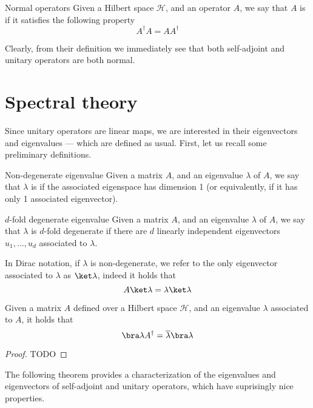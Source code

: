 \documentclass[a4paper, 12pt]{report}
\begin{document}
\begin{frameddefn}{Normal operators}
	Given a Hilbert space $\mathcal H$, and an operator $A$, we say that $A$ is  if it satisfies the following property $$A^\dag A = AA^\dag$$
\end{frameddefn}

Clearly, from their definition we immediately see that both self-adjoint and unitary operators are both normal.

\section{Spectral theory}

Since unitary operators are linear maps, we are interested in their eigenvectors and eigenvalues --- which are defined as usual. First, let us recall some preliminary definitions.

\begin{frameddefn}{Non-degenerate eigenvalue}
	Given a matrix $A$, and an eigenvalue $\lambda$ of $A$, we say that $\lambda$ is  if the associated eigenspace has dimension 1 (or equivalently, if it has only 1 associated eigenvector).
\end{frameddefn}

\begin{frameddefn}{$d$-fold degenerate eigenvalue}
	Given a matrix $A$, and an eigenvalue $\lambda$ of $A$, we say that $\lambda$ is $d$-fold degenerate if there are $d$ linearly independent eigenvectors $u_1, \ldots, u_d$ associated to $\lambda$.
\end{frameddefn}

In Dirac notation, if $\lambda$ is non-degenerate, we refer to the only eigenvector associated to $\lambda$ as $\ket \lambda$, indeed it holds that $$A \ket \lambda = \lambda \ket \lambda$$

\begin{framedprop}{}
	Given a matrix $A$ defined over a Hilbert space $\mathcal H$, and an eigenvalue $\lambda$ associated to $A$, it holds that $$\bra \lambda A^\dag = \overline \lambda \bra \lambda$$
\end{framedprop}

\begin{proof}
	TODO 
\end{proof}

The following theorem provides a characterization of the eigenvalues and eigenvectors of self-adjoint and unitary operators, which have suprisingly nice properties.
\end{document}
